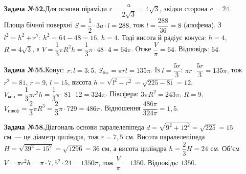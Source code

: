 \documentclass[12pt]{article}
\begin{document}
\par\vspace{0.3cm}\noindent\hypertarget{sol:52}{}
\begin{tcolorbox}[colback=titleBg!40, colframe=mainGreen!55, boxrule=0.4pt, arc=2pt, left=6pt, right=6pt, top=4pt, bottom=4pt, breakable]
\noindent\small\textbf{Задача №52.}\quad Для основи піраміди $r=\dfrac{a}{2\sqrt3}=4\sqrt3$, звідки сторона $a=24$. Площа бічної поверхні $S=\dfrac12\cdot 3a\cdot l=288$, тож $l=\dfrac{288}{36}=8$ (апофема). З $l^2=h^2+r^2$: $h^2=64-48=16$, $h=4$. Тоді висота й радіус конуса: $h=4$, $R=4\sqrt3$, а $V=\dfrac13\pi R^2 h=\dfrac13\pi\cdot48\cdot4=64\pi$. Отже $\dfrac{V}{\pi}=64$. Відповідь: \textbf{$64$}.
\par\vspace{0.1cm}\hfill\hyperlink{task:52}{}
\end{tcolorbox}
\par\vspace{0.3cm}\noindent\hypertarget{sol:55}{}
\begin{tcolorbox}[colback=titleBg!40, colframe=mainGreen!55, boxrule=0.4pt, arc=2pt, left=6pt, right=6pt, top=4pt, bottom=4pt, breakable]
\noindent\small\textbf{Задача №55.}\quad Конус: $r:l=3:5$, $S_{\text{бік}}=\pi rl=135\pi$. Із $l=\dfrac{5r}{3}$: $\pi r\cdot\dfrac{5r}{3}=135\pi$, тож $r^2=81$, $r=9$, $l=15$, висота $h=\sqrt{l^2-r^2}=\sqrt{225-81}=12$, $V_{\text{кон}}=\dfrac13\pi r^2h=\dfrac13\pi\cdot81\cdot12=324\pi$. Півсфера: $3\pi R^2=243\pi$, $R=9$, $V_{\text{півсф}}=\dfrac23\pi R^3=\dfrac23\pi\cdot729=486\pi$. Відношення $\dfrac{486\pi}{324\pi}=1{,}5$.
\par\vspace{0.1cm}\hfill\hyperlink{task:55}{}
\end{tcolorbox}
\par\vspace{0.3cm}\noindent\hypertarget{sol:58}{}
\begin{tcolorbox}[colback=titleBg!40, colframe=mainGreen!55, boxrule=0.4pt, arc=2pt, left=6pt, right=6pt, top=4pt, bottom=4pt, breakable]
\noindent\small\textbf{Задача №58.}\quad Діагональ основи паралелепіпеда $d = \sqrt{9^2+12^2} = \sqrt{225} = 15$ см~--- це діаметр циліндра, тож $r = 7{,}5$ см. Висота паралелепіпеда $H = \sqrt{39^2 - 15^2} = \sqrt{1296} = 36$ см, а висота циліндра $h = \dfrac23 H = 24$ см. Об'єм $V = \pi r^2 h = \pi\cdot 7{,}5^2\cdot 24 = 1350\pi$, тож $\dfrac{V}{\pi} = 1350$. Відповідь: \textbf{$1350$}.
\par\vspace{0.1cm}\hfill\hyperlink{task:58}{}
\end{tcolorbox}
\end{document}
